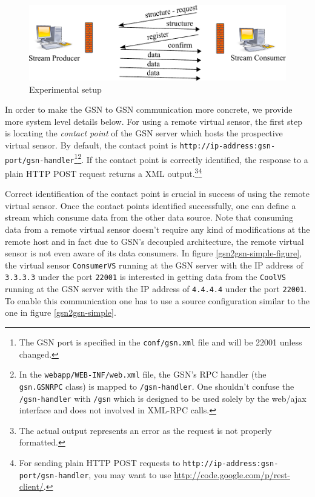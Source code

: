 \begin{figure}%
  \centering
  \includegraphics[width=0.8\columnwidth]{ch-gsn-figures/gsn-network-firewall}
  \caption{Experimental setup}
  \label{fig:gsn-network-firewall}
\end{figure}

In order to make the GSN to GSN communication more concrete, we provide more system level details below.
For using a remote virtual sensor, the first step is locating the \emph{contact point} of the GSN server which
hosts the prospective virtual sensor. By default, the contact point is \texttt{http://ip-address:gsn-port/gsn-handler}\footnote{The GSN port is specified in the \texttt{conf/gsn.xml} file and will be 22001 unless changed.}\footnote{In the \texttt{webapp/WEB-INF/web.xml} file, the GSN's RPC handler (the \texttt{gsn.GSNRPC} class) is mapped to \texttt{/gsn-handler}. One shouldn't confuse the \texttt{/gsn-handler} with \texttt{/gsn} which is designed to be used solely by the web/ajax interface and does not involved in XML-RPC calls.}.
If  the contact point is correctly identified, the response to a plain HTTP POST request 
returns a XML output.\footnote{The actual output represents an error as the request is not properly formatted.}\footnote{For sending plain HTTP POST requests
to \texttt{http://ip-address:gsn-port/gsn-handler}, you may want to use \url{http://code.google.com/p/rest-client/}. }

Correct identification of the contact point is crucial in success of using the remote virtual sensor.
Once the contact points identified successfully, one can define a stream which consume data from the other data source.
Note that consuming data from a remote virtual sensor doesn't require any kind of modifications at the remote host and in fact 
due to GSN's decoupled architecture, the remote virtual sensor is not even aware of its data consumers. In figure \ref{gsn2gsn-simple-figure},
the virtual sensor \texttt{ConsumerVS} running at the GSN server with the IP address of \texttt{3.3.3.3} under the port \texttt{22001} is interested
in getting data from the \texttt{CoolVS} running at the GSN server with the IP address of \texttt{4.4.4.4} under the port \texttt{22001}. To enable this
communication one has to use a source configuration similar to the one in figure \ref{gsn2gsn-simple}.


